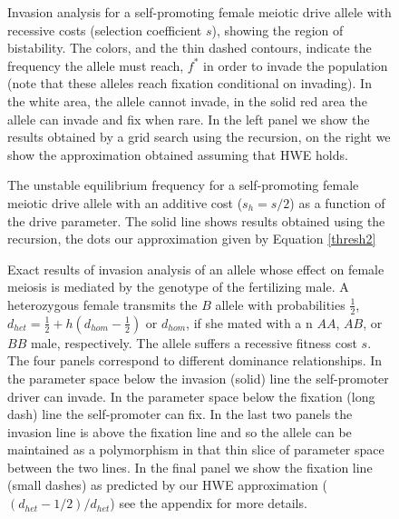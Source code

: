 \documentclass[12pt,letterpaper]{article}
\begin{document}
\begin{figure}
\caption{Invasion analysis for a self-promoting female meiotic drive allele with
  recessive costs (selection coefficient $s$), showing the region of
  bistability. The colors, and the thin dashed contours, indicate the
  frequency the allele must reach, $f^*$ in order to invade the population (note
  that these alleles reach fixation conditional on invading). In the
  white area, the allele cannot invade, in the solid red
  area the allele can invade and fix when rare. In the left panel we
  show the results obtained by a grid search using the recursion, on
  the right we show the approximation obtained assuming that HWE
  holds. }  
\label{Bistab_homozyg_cost_fig}
\end{figure}

\begin{figure}
\caption{The unstable equilibrium frequency for a self-promoting
  female meiotic drive allele with an additive cost ($s_h=s/2$) as a
  function of the drive parameter. The solid line shows results
  obtained using the recursion, the dots our approximation given by Equation \eqref{thresh2}}  \label{bistable_additive}
\end{figure}

\begin{figure}
\caption{Exact results of invasion analysis of an allele whose effect
 on female meiosis is mediated by the genotype of the fertilizing
 male.  
 A heterozygous female transmits the $B$ allele 
  with probabilities  $\frac{1}{2}$,  $d_{het}=\frac{1}{2} + h(d_{hom}-\frac{1}{2}) $ or $d_{hom}$, 
 if she mated with a n $AA$, $AB$, or $BB$ male,  respectively.  
 The allele suffers a recessive fitness cost $s$.  
 The four panels correspond to different dominance relationships.
In the parameter space below the invasion (solid) line the self-promoter
 driver can invade. In the parameter space below the fixation (long
 dash) line the self-promoter can fix. In the last
 two panels the invasion line is above the fixation line and so the
 allele can be maintained as a polymorphism in that thin slice of
 parameter space between the two lines. 
 In the final panel we show the
  fixation line (small dashes) as predicted by our HWE approximation
  ($(d_{het}-1/2)/d_{het}$) see the appendix for more details.
}  \label{Effect_of_dominance}
\end{figure}
\end{document}
